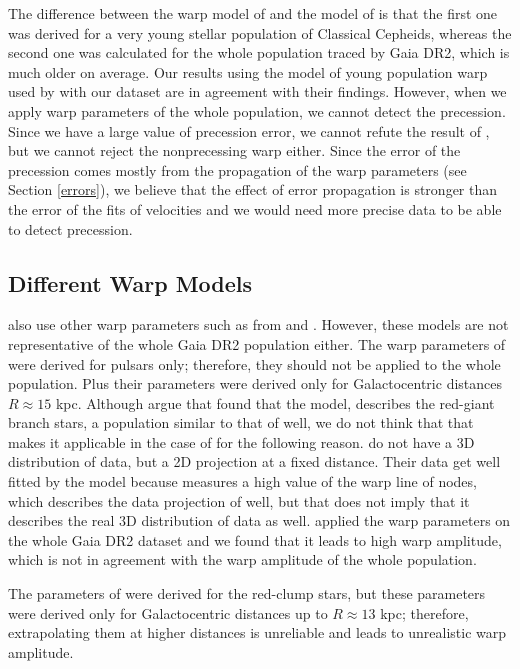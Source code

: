 \documentclass[twocolumn]{aastex63}
\begin{document}
The difference between the warp model of \cite{chen} and the model of \cite{zofi} is that the first one was derived for a very young stellar population of Classical Cepheids, whereas the second one was calculated for the whole population traced by Gaia DR2, which is much older on average. Our results using the model of young population warp used by  with our dataset are in agreement with their findings. However, when we apply warp parameters of the whole population, we cannot detect the precession. Since we have a large value of precession error, we cannot refute the result of , but we cannot reject the nonprecessing warp either. Since the error of the precession comes mostly from the propagation of the warp parameters (see Section \ref{errors}), we believe that the effect of error propagation is stronger than the error of the fits of velocities and we would need more precise data to be able to detect precession.

\subsection{Different Warp Models}
 also use other warp parameters such as from \cite{yusifov} and \cite{martin_warp}. However, these models are not representative of the whole Gaia DR2 population either. The warp parameters of \cite{yusifov} were derived for pulsars only; therefore, they should not be applied to the whole population. Plus their parameters were derived only for Galactocentric distances $R\approx15$ kpc. Although  argue that \cite{momany} found that the \cite{yusifov} model, describes the red-giant branch stars, a population similar to that of  well, we do not think that that makes it applicable in the case of  for the following reason. \cite{momany} do not have a 3D distribution of data, but a 2D projection at a fixed distance. Their data get well fitted by the \cite{yusifov} model because \cite{yusifov} measures a high value of the warp line of nodes, which describes the data projection of \cite{momany} well, but that does not imply that it describes the real 3D distribution of data as well. \cite{zofi} applied the \cite{yusifov} warp parameters on the whole Gaia DR2 dataset and we found that it leads to high warp amplitude, which is not in agreement with the warp amplitude of the whole population. 

The parameters of \cite{martin_warp} were derived for the red-clump stars, but these parameters were derived only for Galactocentric distances up to $R\approx 13$ kpc; therefore, extrapolating them at higher distances is unreliable and leads to unrealistic warp amplitude. 
\end{document}
